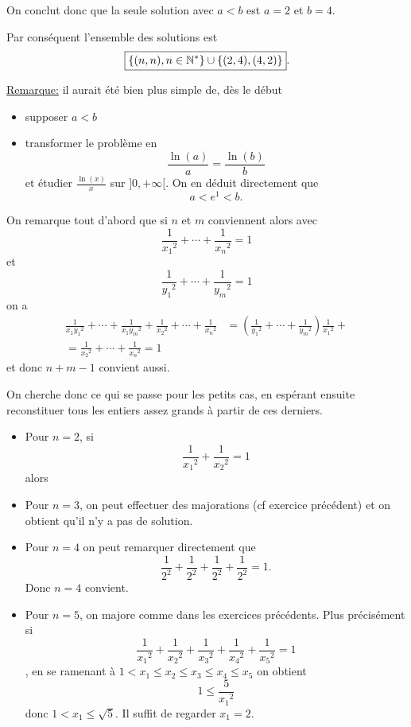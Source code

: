 \begin{sol}
  On conclut donc que la seule solution avec $a<b$  est $a=2$ et $b=4$.


  Par conséquent l'ensemble des solutions est
  $$\boxed{\left\lbrace (n,n), n \in \mathbb N^*\right\rbrace \cup \{(2,4),(4,2)\}}.$$

  \underline{Remarque:} il aurait été bien plus simple de, dès le début
  \begin{itemize}
    \item supposer $a < b$
    \item transformer le problème en
          $$\frac{\ln(a)}{a} = \frac{\ln(b)}{b}$$
          et étudier $\frac{\ln(x)}{x}$ sur $]0,+\infty[$. On en déduit directement que
          $$a < e^1 < b.$$
  \end{itemize}
\end{sol}
\begin{sol}
  On remarque tout d'abord que si $n$ et $m$ conviennent alors avec
  $$\frac{1}{{x_1}^2} + \cdots + \frac{1}{{x_n}^2} =1 $$
  et
  $$\frac{1}{{y_1}^2} + \cdots + \frac{1}{{y_m}^2} =1 $$
  on a
  $$\begin{aligned}
      \frac{1}{{x_1 y_1}^2} + \cdots + \frac{1}{{x_1 y_m}^2} + \frac{1}{{x_2}^2} + \cdots + \frac{1}{{x_n}^2} & = \left(\frac{1}{{y_1}^2} + \cdots + \frac{1}{{y_m}^2} \right) \frac{1}{{x_1}^2}+
      \\ = \frac{1}{{x_2}^2} + \cdots + \frac{1}{{x_n}^2} =1
    \end{aligned}$$
  et donc $n+m-1$ convient aussi.


  On cherche donc ce qui se passe pour les petits cas, en espérant ensuite reconstituer tous les entiers assez grands à partir de ces derniers.


  \begin{itemize}
    \item Pour $n=2$, si
          $$\frac{1}{{x_1}^2} + \frac{1}{{x_2}^2} = 1$$
          alors
    \item Pour $n=3$, on peut effectuer des majorations (cf exercice précédent) et on obtient qu'il n'y a pas de solution.
    \item Pour $n=4$ on peut remarquer directement que
          $$\frac{1}{2^2} + \frac{1}{2^2} + \frac{1}{2^2} + \frac{1}{2^2} = 1.$$
          Donc $n=4$ convient.
    \item Pour $n=5$, on majore comme dans les exercices précédents. Plus précisément si
          $$\frac{1}{{x_1}^2} + \frac{1}{{x_2}^2} + \frac{1}{{x_3}^2} + \frac{1}{{x_4}^2} + \frac{1}{{x_5}^2} = 1$$
          , en se ramenant à $1 < x_1 \leq x_2 \leq x_3 \leq x_4 \leq x_5$ on obtient
          $$1 \leq \frac{5}{{x_1}^2}$$
          donc $1 < x_1 \leq \sqrt{5}$. Il suffit de regarder $x_1 = 2$.


\end{itemize}
\end{sol}
